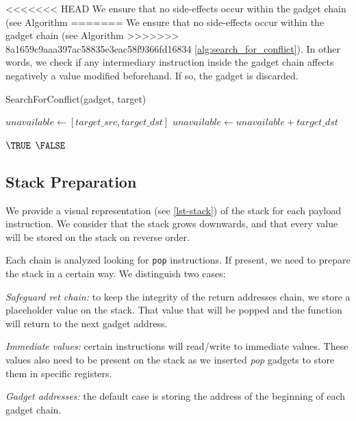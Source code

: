 \documentclass[10pt,twocolumn]{article}
\begin{document}
<<<<<<< HEAD
We ensure that no side-effects occur within the gadget chain (see Algorithm
=======
We ensure that no side-effects occur within the gadget chain (see Algorithm 
>>>>>>> 8a1659c9aaa397ac58835e3eac58f9366fd16834
\autoref{alg:search_for_conflict}). In other words,
we check if any intermediary instruction inside the gadget chain affects
negatively a value modified beforehand. If so, the gadget is discarded.

\begin{algorithm}
    \caption{SearchForConflict(gadget, target)}
    \label{alg:search_for_conflict}
    \begin{algorithmic}[1]
        \STATE $unavailable \leftarrow [target\_src, target\_dst]$
            \STATE $unavailable \leftarrow unavailable + target\_dst$
        \ENDIF

            \RETURN $\TRUE$
            \ENDIF
        \ENDFOR
        \RETURN $\FALSE$
    \end{algorithmic}
\end{algorithm}

\subsection{Stack Preparation}

We provide a visual representation (see \autoref{lst-stack}) of the stack for
each payload instruction.  We consider that the stack grows downwards, and that
every value will be stored on the stack on reverse order.

Each chain is analyzed looking for \texttt{pop} instructions. If present, we
need to prepare the stack in a certain way. We distinguish
two cases:

\textit{Safeguard ret chain:} to keep the integrity of the return addresses
chain, we store a placeholder value on the stack. That value that will be
popped and the function will return to the next gadget address.

\textit{Immediate values:} certain instructions will read/write to immediate
values. These values also need to be present on the stack as we inserted
\textit{pop} gadgets to store them in specific registers.

\textit{Gadget addresses:} the default case is storing the address of the
beginning of each gadget chain.
\end{document}
